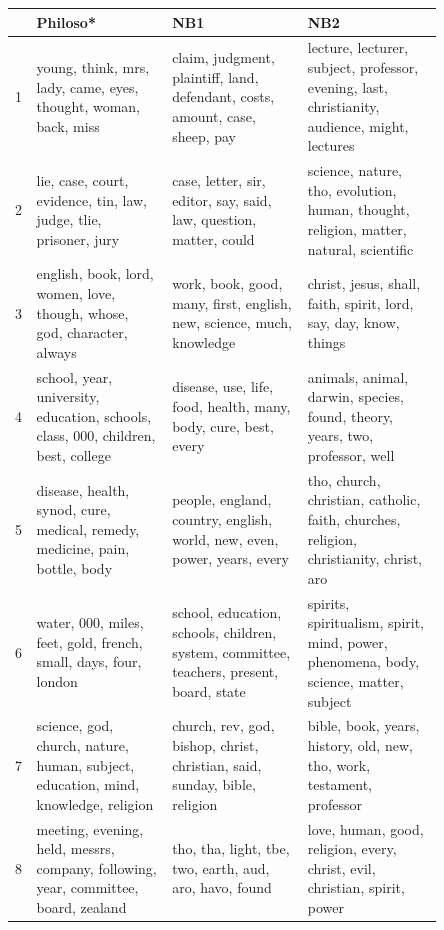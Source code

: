 \documentclass{article}
\begin{document}
\begin{table}[]
        \centering
        \begin{tabular}{p{0.01\linewidth}|p{0.28\linewidth}| p{0.28\linewidth}| p{0.28\linewidth}}
          & \textbf{Philoso*} & \textbf{NB1} & \textbf{NB2}
          \\ \hline
          1 & young, think, mrs, lady, came, eyes, thought, woman, back, miss	& claim, judgment, plaintiff, land, defendant, costs, amount, case, sheep, pay & lecture, lecturer, subject, professor, evening, last, christianity, audience, might, lectures \\
          2	& lie, case, court, evidence, tin, law, judge, tlie, prisoner, jury & case, letter, sir, editor, say, said, law, question, matter, could & science, nature, tho, evolution, human, thought, religion, matter, natural, scientific \\
          3	& english, book, lord, women, love, though, whose, god, character, always & work, book, good, many, first, english, new, science, much, knowledge & christ, jesus, shall, faith, spirit, lord, say, day, know, things \\
          4	& school, year, university, education, schools, class, 000, children, best, college & disease, use, life, food, health, many, body, cure, best, every & animals, animal, darwin, species, found, theory, years, two, professor, well \\
          5	& disease, health, synod, cure, medical, remedy, medicine, pain, bottle, body & people, england, country, english, world, new, even, power, years, every & tho, church, christian, catholic, faith, churches, religion, christianity, christ, aro \\
          6	& water, 000, miles, feet, gold, french, small, days, four, london & school, education, schools, children, system, committee, teachers, present, board, state & spirits, spiritualism, spirit, mind, power, phenomena, body, science, matter, subject \\
          7	& science, god, church, nature, human, subject, education, mind, knowledge, religion & church, rev, god, bishop, christ, christian, said, sunday, bible, religion & bible, book, years, history, old, new, tho, work, testament, professor \\
          8	& meeting, evening, held, messrs, company, following, year, committee, board, zealand & tho, tha, light, tbe, two, earth, aud, aro, havo, found & love, human, good, religion, every, christ, evil, christian, spirit, power \\

\end{tabular}
\end{table}
\end{document}

